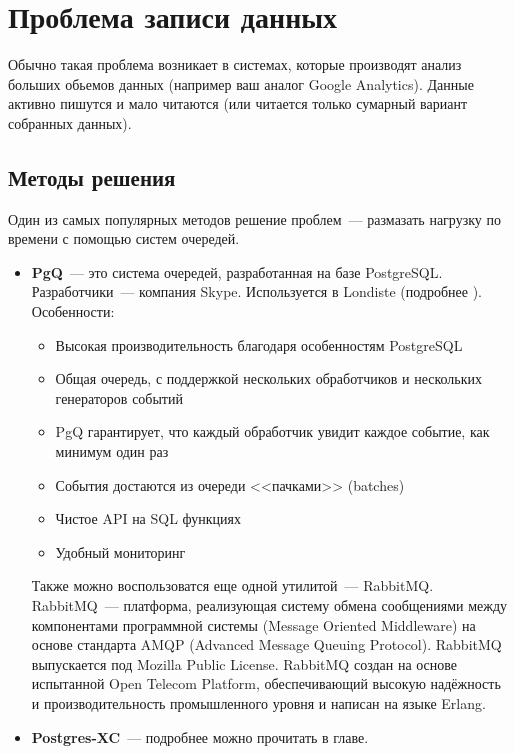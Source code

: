 \section{Проблема записи данных}

Обычно такая проблема возникает в системах, которые производят анализ больших обьемов данных (например ваш аналог Google Analytics). 
Данные активно пишутся и мало читаются (или читается только сумарный вариант собранных данных).

\subsection{Методы решения}

Один из самых популярных методов решение проблем~--- размазать нагрузку по времени с помощью систем очередей.
\begin{itemize}
\item \textbf{PgQ}~--- это система очередей, разработанная на базе PostgreSQL. Разработчики~--- компания Skype. 
Используется в Londiste (подробнее ). Особенности:
\begin{itemize}
\item Высокая производительность благодаря особенностям PostgreSQL
\item Общая очередь, с поддержкой нескольких обработчиков и нескольких генераторов событий
\item PgQ гарантирует, что каждый обработчик увидит каждое событие, как минимум один раз
\item События достаются из очереди <<пачками>> (batches)
\item Чистое API на SQL функциях
\item Удобный мониторинг
\end{itemize}

Также можно воспользоватся еще одной утилитой~--- RabbitMQ. 
RabbitMQ~--- платформа, реализующая систему обмена сообщениями между компонентами программной системы (Message Oriented Middleware) 
на основе стандарта AMQP (Advanced Message Queuing Protocol). RabbitMQ выпускается под Mozilla Public License.
RabbitMQ создан на основе испытанной Open Telecom Platform, обеспечивающий высокую надёжность и производительность промышленного 
уровня и написан на языке Erlang.

\item \textbf{Postgres-XC}~--- подробнее можно прочитать в  главе.
\end{itemize}